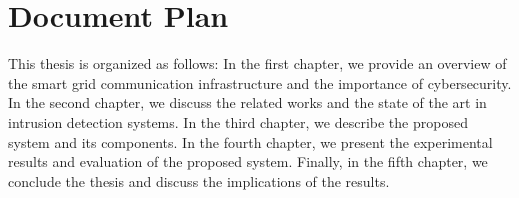 \section*{Document Plan}
This thesis is organized as follows: In the first chapter, we provide an overview of the smart grid communication infrastructure and the importance of cybersecurity. In the second chapter, we discuss the related works and the state of the art in intrusion detection systems. In the third chapter, we describe the proposed system and its components. In the fourth chapter, we present the experimental results and evaluation of the proposed system. Finally, in the fifth chapter, we conclude the thesis and discuss the implications of the results.